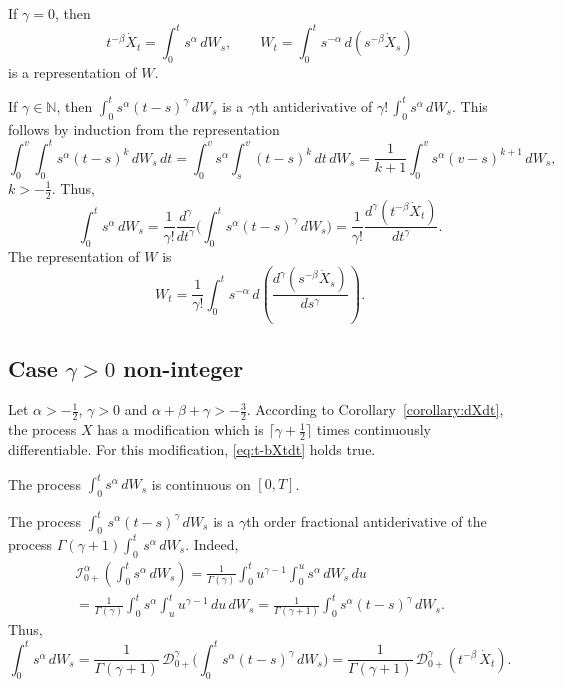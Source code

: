 \documentclass{article}
\newcommand{\dotX}{\dot{X}}
\theoremstyle{plain}
\theoremstyle{remark}
\theoremstyle{definition}
\begin{document}
If $\gamma=0$, then
\[
	t^{-\beta} \dotX_t = \int_0^t s^\alpha \, dW_s, \qquad
	W_t = \int_0^t s^{-\alpha} \, d(s^{-\beta} \dotX_s)
\]
is a representation of $W$.

If $\gamma\in\mathbb{N}$, then
$\int_0^t s^\alpha (t-s)^\gamma \, dW_s$
is a $\gamma$th antiderivative
of $\gamma! \, \int_0^t s^\alpha \, dW_s$.
This follows by induction from the representation
\[
	\int_0^v \int_0^t \! s^\alpha (t{-}s)^k \, dW_s \, dt
	=
	\int_0^v \! s^\alpha \! \int_s^v (t{-}s)^k \, dt \, dW_s
	=
	\frac{1}{k{+}1} \int_0^v \! s^\alpha (v{-}s)^{k+1} \, dW_s,
\]
$k\mathbin{>}{-}\frac12$. Thus,
\[
	\int_0^t s^\alpha \, dW_s = \frac{1}{\gamma!}
	\frac{d^\gamma}{dt^\gamma}
	\biggl(
	\int_0^t s^\alpha (t-s)^\gamma \, dW_s
	\biggr)
	= \frac{1}{\gamma!} \frac{d^\gamma (t^{-\beta} \dotX_t)}
	{dt^\gamma} .
\]
The representation of $W$ is
\[
	 W_t = \frac{1}{\gamma!}
	\int_0^t s^{-\alpha} \,
	d\!\left(
	\frac{d^\gamma (s^{-\beta} \dotX_s)}
	{ds^\gamma}
	\right).
\]

\subsection[Case $\gamma> 0$ non-integer]
{Case \boldmath$\gamma> 0$ non-integer}
\label{ss:invrepgammapositive}
Let $\alpha\mathbin{>}{-}\frac12$, $\gamma\mathbin{>}0$
and $\alpha+\beta+\gamma\mathbin{>}{-}\frac32$.
According to Corollary~\ref{corollary:dXdt},
the process $X$ has a modification
which is $\lceil \gamma{+}\frac12\rceil$ times
continuously differentiable.
For this modification, \eqref{eq:t-bXtdt}
holds true.

 
The process $\int_0^t s^\alpha \, dW_s$ is
continuous on $[0,T]$.

The process $\int_0^t \, s^\alpha (t-s)^\gamma \, dW_s$
is a $\gamma$th order fractional antiderivative
of the process
$\Gamma(\gamma{+}1) \int_0^t \, s^\alpha \, dW_s$.
Indeed,
\begin{multline*}
	\mathcal{I}^\alpha_{0+}\!\left(
	\int_0^t s^\alpha \, dW_s\right)
	=
	\frac{1}{\Gamma(\gamma)}
	\int_0^t u^{\gamma-1} \int_0^u s^\alpha \, dW_s \, du
	\\=
	\frac{1}{\Gamma(\gamma)}
	\int_0^t s^\alpha \int_u^t u^{\gamma-1} \, du \, dW_s
	=
	\frac{1}{\Gamma(\gamma{+}1)}
	\int_0^t s^\alpha (t-s)^\gamma \, dW_s .
\end{multline*}
Thus,
\[
	\int_0^t s^\alpha \, dW_s
	= \frac{1}{\Gamma(\gamma{+}1)}
	\, \mathcal{D}^{\gamma}_{0+} \!
	\biggl( \int_0^t s^\alpha (t-s)^\gamma \, dW_s \biggr)
	= \frac{1}{\Gamma(\gamma{+}1)}
	\, \mathcal{D}^{\gamma}_{0+} (t^{-\beta} \, \dotX_t) .
\]
\end{document}
